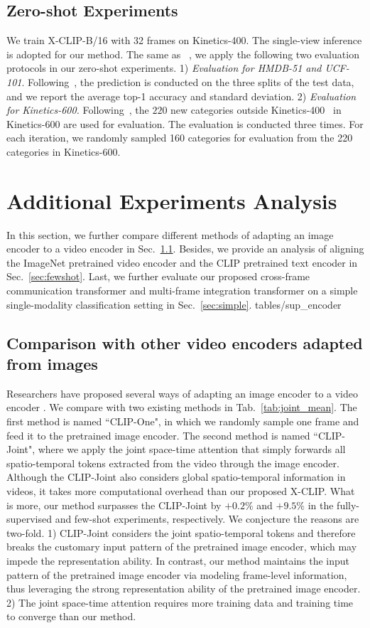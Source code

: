\documentclass[runningheads]{llncs}
\begin{document}
\subsection{Zero-shot Experiments}\label{sec:split_zero}
We train X-CLIP-B/16 with 32 frames on Kinetics-400. The single-view inference is adopted for our method. The same as ~\cite{chen2021elaborative,clip}, we apply the following two evaluation protocols in our zero-shot experiments. 1) \textit{Evaluation for HMDB-51 and UCF-101}. Following~\cite{clip}, the prediction is conducted on the three splits of the test data, and we report the average top-1 accuracy and standard deviation. 2) \textit{Evaluation for Kinetics-600.} Following~\cite{chen2021elaborative}, the $220$ new categories outside Kinetics-400~\cite{k400} in Kinetics-600 are used for evaluation. The evaluation is conducted three times. For each iteration, we randomly sampled 160 categories for evaluation from the 220 categories in Kinetics-600.


\section{Additional Experiments Analysis}\label{sec:additional_exp}
In this section, we further compare different methods of adapting an image encoder to a video encoder in Sec.~\ref{sec:encoder}. Besides, we provide an analysis of aligning the ImageNet pretrained video encoder and the CLIP pretrained text encoder in Sec.~\ref{sec:fewshot}. Last, we further evaluate our proposed cross-frame communication transformer and multi-frame integration transformer on a simple single-modality classification setting in Sec.~\ref{sec:simple}. 
{tables/sup_encoder}
\subsection{Comparison with other video encoders adapted from images}\label{sec:encoder}
Researchers have proposed several ways of adapting an image encoder to a video encoder \cite{arnab2021vivit,timesformer2021}. We compare with two existing methods in Tab.~\ref{tab:joint_mean}.  The first method is named ``CLIP-One", in which we randomly sample one frame and feed it to the pretrained image encoder. The second method is named ``CLIP-Joint", where we apply the joint space-time attention \cite{arnab2021vivit} that simply forwards all spatio-temporal tokens extracted from the video through the image encoder. Although the CLIP-Joint also considers global spatio-temporal information in videos, it takes more computational overhead than our proposed X-CLIP. What is more, our method surpasses the CLIP-Joint by $+0.2\%$ and $+9.5\%$ in the fully-supervised and few-shot experiments, respectively. We conjecture the reasons are two-fold. 1) CLIP-Joint considers the joint spatio-temporal tokens and therefore breaks the customary input pattern of the pretrained image encoder, which may impede the representation ability. In contrast, our method maintains the input pattern of the pretrained image encoder via modeling frame-level information, thus leveraging the strong representation ability of the pretrained image encoder. 2) The joint space-time attention requires more training data and training time to converge than our method. 
\end{document}
